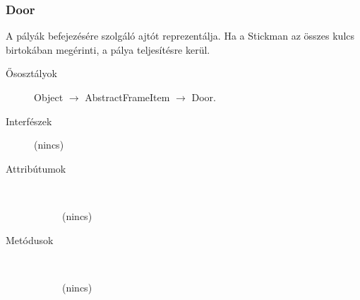 		\subsubsection{Door}
				 A pályák befejezésére szolgáló ajtót reprezentálja.  Ha a Stickman az összes kulcs birtokában megérinti,  a pálya teljesítésre kerül. 			\begin{description}


				\item[Ősosztályok] Object $\rightarrow{}$ AbstractFrameItem $\rightarrow{}$ Door.
				\item[Interfészek] (nincs)
				\item[Attribútumok]$\ $
					\begin{description}
						\item[] (nincs)
					\end{description}
				\item[Metódusok]$\ $
					\begin{description}
						\item[] (nincs)
					\end{description}
			\end{description}

